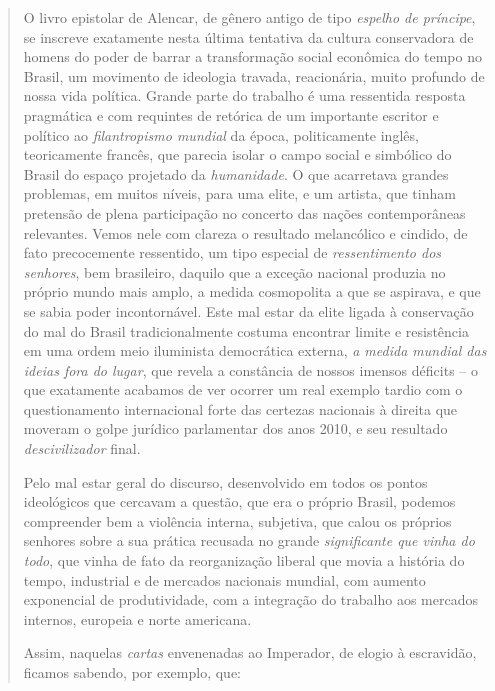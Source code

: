 \begin{quote}
O livro epistolar de Alencar, de gênero antigo de tipo \emph{espelho de
príncipe}, se inscreve exatamente nesta última tentativa da cultura
conservadora de homens do poder de barrar a transformação social
econômica do tempo no Brasil, um movimento de ideologia travada,
reacionária, muito profundo de nossa vida política. Grande parte do
trabalho é uma ressentida resposta pragmática e com requintes de
retórica de um importante escritor e político ao \emph{filantropismo
mundial} da época, politicamente inglês, teoricamente francês, que
parecia isolar o campo social e simbólico do Brasil do espaço projetado
da \emph{humanidade}. O que acarretava grandes problemas, em muitos
níveis, para uma elite, e um artista, que tinham pretensão de plena
participação no concerto das nações contemporâneas relevantes. Vemos
nele com clareza o resultado melancólico e cindido, de fato precocemente
ressentido, um tipo especial de \emph{ressentimento dos senhores}, bem
brasileiro, daquilo que a exceção nacional produzia no próprio mundo
mais amplo, a medida cosmopolita a que se aspirava, e que se sabia poder
incontornável. Este mal estar da elite ligada à conservação do mal do
Brasil tradicionalmente costuma encontrar limite e resistência em uma
ordem meio iluminista democrática externa, \emph{a medida mundial das
ideias fora do lugar}, que revela a constância de nossos imensos
déficits -- o que exatamente acabamos de ver ocorrer um real exemplo
tardio com o questionamento internacional forte das certezas nacionais à
direita que moveram o golpe jurídico parlamentar dos anos 2010, e seu
resultado \emph{descivilizador} final.

Pelo mal estar geral do discurso, desenvolvido em todos os pontos
ideológicos que cercavam a questão, que era o próprio Brasil, podemos
compreender bem a violência interna, subjetiva, que calou os próprios
senhores sobre a sua prática recusada no grande \emph{significante que
vinha do todo}, que vinha de fato da reorganização liberal que movia a
história do tempo, industrial e de mercados nacionais mundial, com
aumento exponencial de produtividade, com a integração do trabalho aos
mercados internos, europeia e norte americana.

Assim, naquelas \emph{cartas} envenenadas ao Imperador, de elogio à
escravidão, ficamos sabendo, por exemplo, que:


\end{quote}
